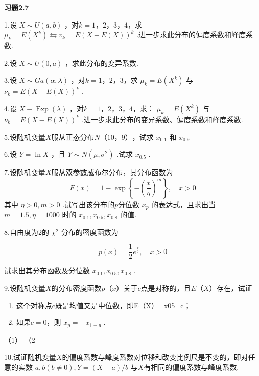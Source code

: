 \begin{center}
	\textbf{习题2.7}
\end{center}

1.设 $X \sim U(a, b)$ ，对$ k=1，2，3，4 $，求 $\mu_{k}=E\left(X^{k}\right) \leftrightarrows v_{k}=E(X-E(X))^{k}$ .进一步求此分布的偏度系数和峰度系数.

2.设 $X \sim U(0, a)$ ，求此分布的变异系数.

3.设 $X \sim G a(\alpha, \lambda)$ ，对$ k=1，2，3 $，求 $\mu_{k}=E\left(X^{k}\right)$ 与 $\nu_{k}=E(X-E(X))^{k}$ .

4.设 $X-\operatorname{Exp}(\lambda)$ ，对$ k=1，2，3，4 $，求： $\mu_{k}=E\left(X^{k}\right)$ 与 $\nu_{k}=E(X-E(X))^{k}$ .进一步求此分布的变异系数、偏度系数和峰度系数.

5.设随机变量$ X $服从正态分布$ N（10，9） $，试求 $x_{0.1}$ 和 $x_{0.9}$ 

6.设 $Y=\ln X$ ，且 $Y \sim N\left(\mu, \sigma^{2}\right)$ .试求 $x_{0.5}$ .

7.设随机变量$ X $服从双参数威布尔分布，其分布函数为
\[
F(x)=1-\exp \left\{-\left(\frac{x}{\eta}\right)^{m}\right\}, \quad x>0
\]
其中 $\eta>0, m>0$ .试写出该分布的$ p $分位数 $x_{p}$ 的表达式，且求出当 $m=1.5, \eta=1000$ 时的 $x_{0.1}, x_{0.5}, x_{0.8}$ 的值.

8.自由度为2的 $\chi^{2}$ 分布的密度函数为

\[
p(x)=\frac{1}{2} e^{\frac{x}{2}}, \quad x>0
\]

试求出其分布函数及分位数 $x_{0.1}, x_{0.5}, x_{0.8}$ .

9.设随机变量$ X $的分布密度函数$ p（x） $关于$ c $点是对称的，且$ E（X） $存在，试证

\begin{enumerate}
	\item 这个对称点c既是均值又是中位数，即E（X）=x05=c；
	\item 如果$ c=0 $，则 $x_{p}=-x_{1-p}$ .
\end{enumerate}（1）
（2

10.试证随机变量$ X $的偏度系数与峰度系数对位移和改变比例尺是不变的，即对任意的实数 $a, b(b \neq 0), Y=(X-a) / b$ 与$ X $有相同的偏度系数与峰度系数.


